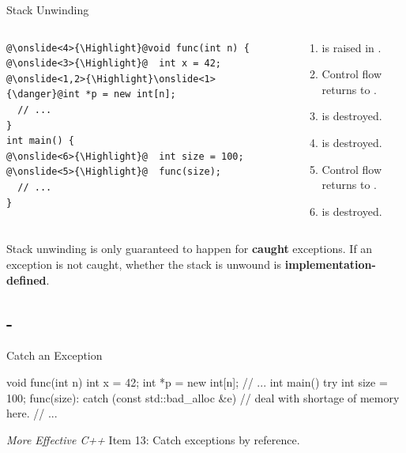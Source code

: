 \documentclass{beamer}
\newcommand{\Highlight}{\makebox[0pt][l]{\color{pink}\rule[-4pt]{\textwidth}{11pt}}}
\begin{document}
\begin{frame}[fragile]{Stack Unwinding}
  \begin{columns}
    \begin{column}{0.4\linewidth}
      \begin{lstlisting}[language = {[11]C++}, escapechar = \@]
@\onslide<4>{\Highlight}@void func(int n) {
@\onslide<3>{\Highlight}@  int x = 42;
@\onslide<1,2>{\Highlight}\onslide<1>{\danger}@int *p = new int[n];
  // ...
}
int main() {
@\onslide<6>{\Highlight}@  int size = 100;
@\onslide<5>{\Highlight}@  func(size);
  // ...
}
      \end{lstlisting}
    \end{column}
    \begin{column}{0.6\linewidth}
      \begin{enumerate}
        \item {} is raised in \ttt{[]}.
        \item Control flow returns to .
        \item {} is destroyed.
        \item {} is destroyed.
        \item Control flow returns to .
        \item {} is destroyed.
      \end{enumerate}
    \end{column}
  \end{columns}
  \begin{notice}
    Stack unwinding is only guaranteed to happen for \textbf{caught} exceptions. If an exception is not caught, whether the stack is unwound is \textbf{implementation-defined}.
  \end{notice}
\end{frame}

\subsection{-}

\begin{frame}[fragile]{Catch an Exception}
  \begin{cpp}
void func(int n) {
  int x = 42;
  int *p = new int[n];
  // ...
}
int main() {
  try {
    int size = 100;
    func(size):
  } catch (const std::bad_alloc &e) {
    // deal with shortage of memory here.
  }
  // ...
}
  \end{cpp}
  \textit{More Effective C++} Item 13: Catch exceptions by reference.
\end{frame}
\end{document}
